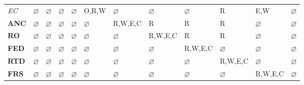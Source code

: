\documentclass[10pt,journal,compsoc]{IEEEtran}
\begin{document}
\begin{table}[]
{\begin{tabular}{l|lllllllllll}
      \textit{EC}  & $\varnothing$                        & $\varnothing$                        & $\varnothing$                        & $\varnothing$                        & O,R,W                                & $\varnothing$                        & $\varnothing$                        & $\varnothing$                        & R                                    & {\color[HTML]{CB0000} E,W}             & {\color[HTML]{009901} $\varnothing$} \\
      \textbf{ANC} & $\varnothing$                        & $\varnothing$                        & $\varnothing$                        & $\varnothing$                        & $\varnothing$                        & R,W,E,C                              & R                                    & R                                    & R                                    & $\varnothing$                        & {\color[HTML]{009901} $\varnothing$} \\
      \textbf{RO}  & $\varnothing$                        & $\varnothing$                        & $\varnothing$                        & $\varnothing$                        & $\varnothing$                        & $\varnothing$                        & R,W,E,C                              & R                                    & R                                    & $\varnothing$                        & {\color[HTML]{009901} $\varnothing$} \\
      \textbf{FED} & $\varnothing$                        & $\varnothing$                        & $\varnothing$                        & $\varnothing$                        & $\varnothing$                        & $\varnothing$                        & $\varnothing$                        & R,W,E,C                              & $\varnothing$                        & $\varnothing$                        & {\color[HTML]{009901} $\varnothing$} \\
      \textbf{RTD} & $\varnothing$                        & $\varnothing$                        & $\varnothing$                        & $\varnothing$                        & $\varnothing$                        & $\varnothing$                        & $\varnothing$                        & $\varnothing$                        & R,W,E,C                              & $\varnothing$                        & {\color[HTML]{009901} $\varnothing$} \\
      \textbf{FRS} & $\varnothing$                        & $\varnothing$                        & $\varnothing$                        & $\varnothing$                        & $\varnothing$                        & $\varnothing$                        & $\varnothing$                        & $\varnothing$                        & $\varnothing$                        & R,W,E,C                              & {\color[HTML]{009901} $\varnothing$} \\

\end{tabular}}
\end{table}
\end{document}
